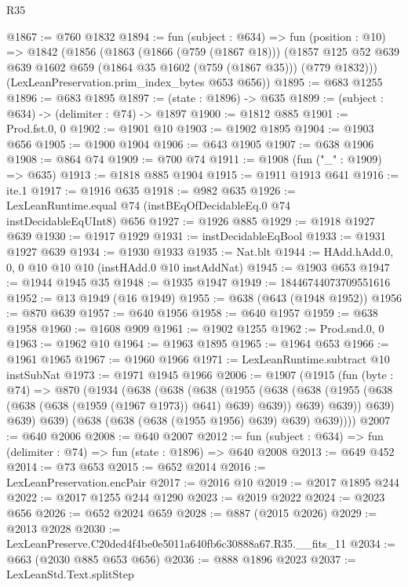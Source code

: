 \begin{lexlean}{R35}
\begin{coremodule}
@1867 := @760 @1832
@1894 := fun (subject : @634) =>
  fun (position : @10) =>
  @1842
    (@1856
      (@1863
        (@1866 (@759 (@1867 @18)))
        (@1857 @125 @52 @639 @639 @1602 @659 (@1864 @35 @1602 (@759 (@1867 @35))) (@779 @1832)))
      (LexLeanPreservation.prim_index_bytes @653 @656))
@1895 := @683 @1255
@1896 := @683 @1895
@1897 := (state : @1896) -> @635
@1899 := (subject : @634) -> (delimiter : @74) -> @1897
@1900 := @1812 @885
@1901 := Prod.fst.{0, 0}
@1902 := @1901 @10
@1903 := @1902 @1895
@1904 := @1903 @656
@1905 := @1900 @1904
@1906 := @643 @1905
@1907 := @638 @1906
@1908 := @864 @74
@1909 := @700 @74
@1911 := @1908 (fun ("_" : @1909) => @635)
@1913 := @1818 @885 @1904
@1915 := @1911 @1913 @641
@1916 := ite.{1}
@1917 := @1916 @635
@1918 := @982 @635
@1926 := LexLeanRuntime.equal @74 (instBEqOfDecidableEq.{0} @74 instDecidableEqUInt8) @656
@1927 := @1926 @885
@1929 := @1918 @1927 @639
@1930 := @1917 @1929
@1931 := instDecidableEqBool
@1933 := @1931 @1927 @639
@1934 := @1930 @1933
@1935 := Nat.blt
@1944 := HAdd.hAdd.{0, 0, 0} @10 @10 @10 (instHAdd.{0} @10 instAddNat)
@1945 := @1903 @653
@1947 := @1944 @1945 @35
@1948 := @1935 @1947
@1949 := 18446744073709551616
@1952 := @13 @1949 (@16 @1949)
@1955 := @638 (@643 (@1948 @1952))
@1956 := @870 @639
@1957 := @640 @1956
@1958 := @640 @1957
@1959 := @638 @1958
@1960 := @1608 @909
@1961 := @1902 @1255
@1962 := Prod.snd.{0, 0}
@1963 := @1962 @10
@1964 := @1963 @1895
@1965 := @1964 @653
@1966 := @1961 @1965
@1967 := @1960 @1966
@1971 := LexLeanRuntime.subtract @10 instSubNat
@1973 := @1971 @1945 @1966
@2006 := @1907
    (@1915
      (fun (byte : @74) =>
      @870
        (@1934
          (@638
            (@638
              (@638
                (@1955
                  (@638
                    (@638 (@1955 (@638 (@638 (@638 (@1959 (@1967 @1973)) @641) @639) @639)) @639)
                    @639))
                @639)
              @639)
            @639)
          (@638 (@638 (@638 (@1955 @1956) @639) @639) @639))))
@2007 := @640 @2006
@2008 := @640 @2007
@2012 := fun (subject : @634) => fun (delimiter : @74) => fun (state : @1896) => @640 @2008
@2013 := @649 @452
@2014 := @73 @653
@2015 := @652 @2014
@2016 := LexLeanPreservation.encPair
@2017 := @2016 @10
@2019 := @2017 @1895 @244
@2022 := @2017 @1255 @244 @1290
@2023 := @2019 @2022
@2024 := @2023 @656
@2026 := @652 @2024 @659
@2028 := @887 (@2015 @2026)
@2029 := @2013 @2028
@2030 := LexLeanPreserve.C20ded4f4be0e5011a640fb6c30888a67.R35.__fits_11
@2034 := @663 (@2030 @885 @653 @656)
@2036 := @888 @1896 @2023
@2037 := LexLeanStd.Text.splitStep

\end{coremodule}
\end{lexlean}
